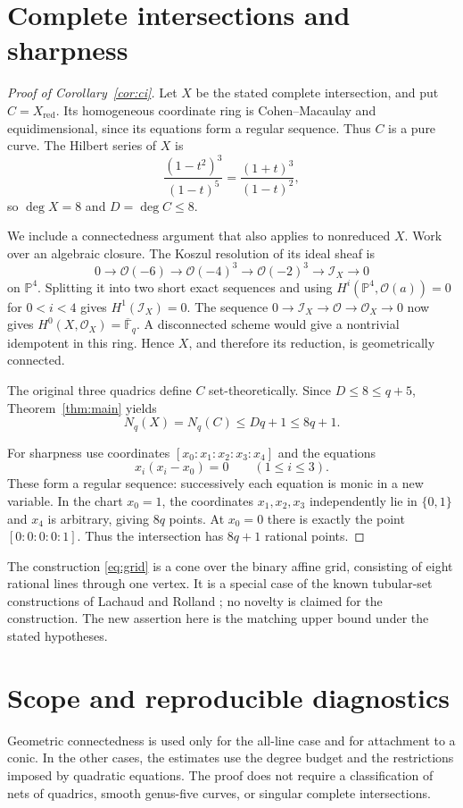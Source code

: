 \documentclass[11pt]{article}
\theoremstyle{remark}\newtheorem{remark}[theorem]{Remark}
\newcommand{\F}{\mathbb F}
\newcommand{\PP}{\mathbb P}
\newcommand{\OO}{\mathcal O}
\newcommand{\Nq}{N_q}
\begin{document}
\section{Complete intersections and sharpness}
\begin{proof}[Proof of Corollary~\ref{cor:ci}]
Let $X$ be the stated complete intersection, and put $C=X_{\mathrm{red}}$. Its homogeneous coordinate ring is Cohen--Macaulay and equidimensional, since its equations form a regular sequence. Thus $C$ is a pure curve. The Hilbert series of $X$ is
\[
 \frac{(1-t^2)^3}{(1-t)^5}=\frac{(1+t)^3}{(1-t)^2},
\]
so $\deg X=8$ and $D=\deg C\le8$.

We include a connectedness argument that also applies to nonreduced $X$. Work over an algebraic closure. The Koszul resolution of its ideal sheaf is
\[
 0\longrightarrow\OO(-6)\longrightarrow\OO(-4)^3
  \longrightarrow\OO(-2)^3\longrightarrow\mathcal I_X\longrightarrow0
\]
on $\PP^4$. Splitting it into two short exact sequences and using
$H^i(\PP^4,\OO(a))=0$ for $0<i<4$ gives $H^1(\mathcal I_X)=0$. The sequence
$0\to\mathcal I_X\to\OO\to\OO_X\to0$ now gives
$H^0(X,\OO_X)=\overline{\F}_q$. A disconnected scheme would give a nontrivial idempotent in this ring. Hence $X$, and therefore its reduction, is geometrically connected.

The original three quadrics define $C$ set-theoretically. Since $D\le8\le q+5$, Theorem~\ref{thm:main} yields
\[
 \Nq(X)=\Nq(C)\le Dq+1\le8q+1.
\]

For sharpness use coordinates $[x_0:x_1:x_2:x_3:x_4]$ and the equations
\begin{equation}\label{eq:grid}
 x_i(x_i-x_0)=0\qquad(1\le i\le3).
\end{equation}
These form a regular sequence: successively each equation is monic in a new variable. In the chart $x_0=1$, the coordinates $x_1,x_2,x_3$ independently lie in $\{0,1\}$ and $x_4$ is arbitrary, giving $8q$ points. At $x_0=0$ there is exactly the point $[0:0:0:0:1]$. Thus the intersection has $8q+1$ rational points.
\end{proof}

The construction \eqref{eq:grid} is a cone over the binary affine grid, consisting of eight rational lines through one vertex. It is a special case of the known tubular-set constructions of Lachaud and Rolland \cite{LR}; no novelty is claimed for the construction. The new assertion here is the matching upper bound under the stated hypotheses.

\section{Scope and reproducible diagnostics}
Geometric connectedness is used only for the all-line case and for attachment to a conic. In the other cases, the estimates use the degree budget and the restrictions imposed by quadratic equations. The proof does not require a classification of nets of quadrics, smooth genus-five curves, or singular complete intersections.
\end{document}
